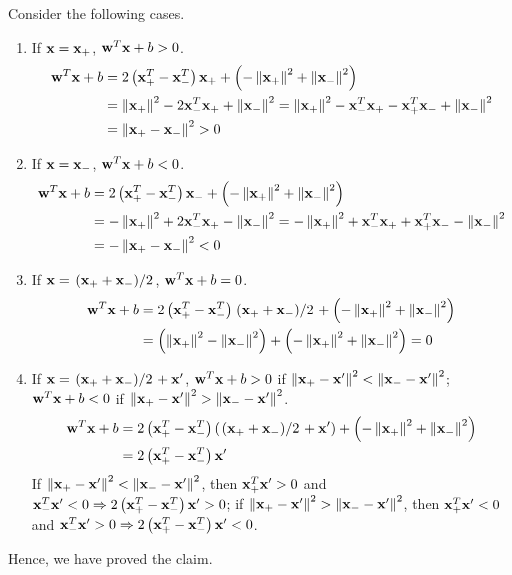 \documentclass[12pt]{article}
\newcommand{\ParTh}[1]{\left(#1\right)}
\newcommand{\BF}[1]{{\bf#1}}
\newcommand{\VecAbsVal}[1]{\left\|#1\right\|}
\newcommand{\Divide}[2]{\left.#1\middle/#2\right.}
\begin{document}
Consider the following cases.
\begin{enumerate}
	\item If $\BF{x}=\BF{x}_+$, $\BF{w}^T\BF{x}+b>0$.
	\begin{align}
	\BF{w}^T\BF{x}+b&=2\ParTh{\BF{x}^T_+-\BF{x}^T_-}\BF{x}_++\ParTh{-\VecAbsVal{\BF{x}_+}^2+\VecAbsVal{\BF{x}_-}^2}\\
	&=\VecAbsVal{\BF{x}_+}^2-2\BF{x}^T_-\BF{x}_++\VecAbsVal{\BF{x}_-}^2=\VecAbsVal{\BF{x}_+}^2-\BF{x}^T_-\BF{x}_+-\BF{x}^T_+\BF{x}_-+\VecAbsVal{\BF{x}_-}^2\\
	&=\VecAbsVal{\BF{x}_+-\BF{x}_-}^2>0
	\end{align}
	\item If $\BF{x}=\BF{x}_-$, $\BF{w}^T\BF{x}+b<0$.
	\begin{align}
	\BF{w}^T\BF{x}+b&=2\ParTh{\BF{x}^T_+-\BF{x}^T_-}\BF{x}_-+\ParTh{-\VecAbsVal{\BF{x}_+}^2+\VecAbsVal{\BF{x}_-}^2}\\
	&=-\VecAbsVal{\BF{x}_+}^2+2\BF{x}^T_-\BF{x}_+-\VecAbsVal{\BF{x}_-}^2=-\VecAbsVal{\BF{x}_+}^2+\BF{x}^T_-\BF{x}_++\BF{x}^T_+\BF{x}_--\VecAbsVal{\BF{x}_-}^2\\
	&=-\VecAbsVal{\BF{x}_+-\BF{x}_-}^2<0
	\end{align}
	\item If $\BF{x}=\Divide{\ParTh{\BF{x}_++\BF{x}_-}}{2}$, $\BF{w}^T\BF{x}+b=0$.
	\begin{align}
	\BF{w}^T\BF{x}+b&=2\ParTh{\BF{x}^T_+-\BF{x}^T_-}\Divide{\ParTh{\BF{x}_++\BF{x}_-}}{2}+\ParTh{-\VecAbsVal{\BF{x}_+}^2+\VecAbsVal{\BF{x}_-}^2}\\
	&=\ParTh{\VecAbsVal{\BF{x}_+}^2-\VecAbsVal{\BF{x}_-}^2}+\ParTh{-\VecAbsVal{\BF{x}_+}^2+\VecAbsVal{\BF{x}_-}^2}=0
	\end{align}
	\item If $\BF{x}=\Divide{\ParTh{\BF{x}_++\BF{x}_-}}{2}+\BF{x}^\prime$, $\BF{w}^T\BF{x}+b>0$ if $\VecAbsVal{\BF{x}_+-\BF{x}^\prime}^2<\VecAbsVal{\BF{x}_--\BF{x}^\prime}^2$; $\BF{w}^T\BF{x}+b<0$ if $\VecAbsVal{\BF{x}_+-\BF{x}^\prime}^2>\VecAbsVal{\BF{x}_--\BF{x}^\prime}^2$.
	\begin{align}
	\BF{w}^T\BF{x}+b&=2\ParTh{\BF{x}^T_+-\BF{x}^T_-}\ParTh{\Divide{\ParTh{\BF{x}_++\BF{x}_-}}{2}+\BF{x}^\prime}+\ParTh{-\VecAbsVal{\BF{x}_+}^2+\VecAbsVal{\BF{x}_-}^2}\\
	&=2\ParTh{\BF{x}^T_+-\BF{x}^T_-}\BF{x}^\prime
	\end{align}
	If $\VecAbsVal{\BF{x}_+-\BF{x}^\prime}^2<\VecAbsVal{\BF{x}_--\BF{x}^\prime}^2$, then $\BF{x}^T_+\BF{x}^\prime>0$ and $\BF{x}^T_-\BF{x}^\prime<0\Rightarrow2\ParTh{\BF{x}^T_+-\BF{x}^T_-}\BF{x}^\prime>0$; if $\VecAbsVal{\BF{x}_+-\BF{x}^\prime}^2>\VecAbsVal{\BF{x}_--\BF{x}^\prime}^2$, then $\BF{x}^T_+\BF{x}^\prime<0$ and $\BF{x}^T_-\BF{x}^\prime>0\Rightarrow2\ParTh{\BF{x}^T_+-\BF{x}^T_-}\BF{x}^\prime<0$.
\end{enumerate}
Hence, we have proved the claim.
\end{document}
